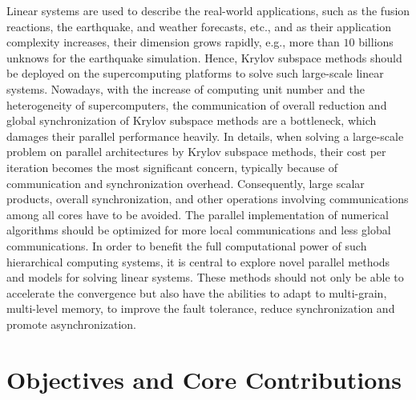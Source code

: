 Linear systems are used to describe the real-world applications, such as the fusion reactions, the earthquake, and weather forecasts, etc., and as their application complexity increases, their dimension grows rapidly, e.g., more than $10$ billions unknows for the earthquake simulation. Hence, Krylov subspace methods should be deployed on the supercomputing platforms to solve such large-scale linear systems. Nowadays, with the increase of computing unit number and the heterogeneity of supercomputers, the communication of overall reduction and global synchronization of Krylov subspace methods are a bottleneck, which damages their parallel performance heavily. In details, when solving a large-scale problem on parallel architectures by Krylov subspace methods, their cost per iteration becomes the most significant concern, typically because of communication and synchronization overhead. Consequently, large scalar products, overall synchronization, and other operations involving communications among all cores have to be avoided. The parallel implementation of numerical algorithms should be optimized for more local communications and less global communications. In order to benefit the full computational power of such hierarchical computing systems, it is central to explore novel parallel methods and models for solving linear systems. These methods should not only be able to accelerate the convergence but also have the abilities to adapt to multi-grain, multi-level memory, to improve the fault tolerance, reduce synchronization and promote asynchronization.

\section{Objectives and Core Contributions}

